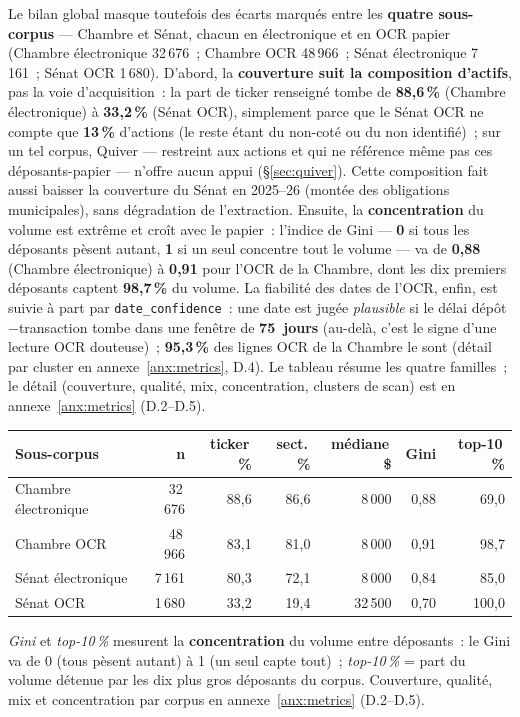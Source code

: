 \documentclass[11pt,a4paper]{article}
\newcommand{\co}[1]{\texttt{\small #1}}
\begin{document}
Le bilan global masque toutefois des écarts marqués entre les \textbf{quatre sous-corpus} — Chambre et
Sénat, chacun en électronique et en OCR papier (Chambre électronique 32\,676~; Chambre OCR 48\,966~; Sénat
électronique 7\,161~; Sénat OCR 1\,680). D'abord, la \textbf{couverture suit la composition d'actifs}, pas
la voie d'acquisition~: la part de ticker renseigné tombe de \textbf{88,6\,\%} (Chambre électronique) à
\textbf{33,2\,\%} (Sénat OCR), simplement parce que le Sénat OCR ne compte que \textbf{13\,\%} d'actions
(le reste étant du non-coté ou du non identifié)~; sur un tel corpus, Quiver — restreint aux actions et qui
ne référence même pas ces déposants-papier — n'offre aucun appui (§\ref{sec:quiver}). Cette composition
fait aussi baisser la couverture du Sénat en 2025--26 (montée des obligations municipales), sans dégradation
de l'extraction. Ensuite, la
\textbf{concentration} du volume est extrême et croît avec le papier~: l'indice de Gini — \textbf{0} si
tous les déposants pèsent autant, \textbf{1} si un seul concentre tout le volume — va de \textbf{0,88}
(Chambre électronique) à \textbf{0,91} pour l'OCR de la Chambre, dont les dix premiers déposants captent
\textbf{98,7\,\%} du volume. La fiabilité des dates de l'OCR, enfin, est suivie à part par
\co{date_confidence}~: une date est jugée \emph{plausible} si le délai dépôt$-$transaction tombe dans une
fenêtre de \textbf{75~jours} (au-delà, c'est le signe d'une lecture OCR douteuse)~; \textbf{95,3\,\%} des
lignes OCR de la Chambre le sont (détail par cluster en annexe~\ref{anx:metrics}, D.4). Le tableau résume les
quatre familles~; le détail (couverture, qualité, mix, concentration, clusters de scan) est en
annexe~\ref{anx:metrics} (D.2--D.5).

\begin{center}\small
\begin{tabular}{l r rr r rr}
\toprule
\bfseries Sous-corpus & \bfseries n & \bfseries ticker\,\% & \bfseries sect.\,\% & \bfseries médiane\,\$ & \bfseries Gini & \bfseries top-10\,\%\\
\midrule
{\color{houseC}Chambre électronique} & 32\,676 & 88,6 & 86,6 & 8\,000 & 0,88 & 69,0 \\
{\color{houseC}Chambre OCR} & 48\,966 & 83,1 & 81,0 & 8\,000 & 0,91 & 98,7 \\
{\color{senateC}Sénat électronique} & 7\,161 & 80,3 & 72,1 & 8\,000 & 0,84 & 85,0 \\
{\color{senateC}Sénat OCR} & 1\,680 & 33,2 & 19,4 & 32\,500 & 0,70 & 100,0 \\
\bottomrule
\end{tabular}
\end{center}
{\footnotesize \emph{Gini} et \emph{top-10\,\%} mesurent la \textbf{concentration} du volume entre
déposants~: le Gini va de 0 (tous pèsent autant) à 1 (un seul capte tout)~; \emph{top-10\,\%} = part du
volume détenue par les dix plus gros déposants du corpus. Couverture, qualité, mix et concentration par
corpus en annexe~\ref{anx:metrics} (D.2--D.5).}
\end{document}
